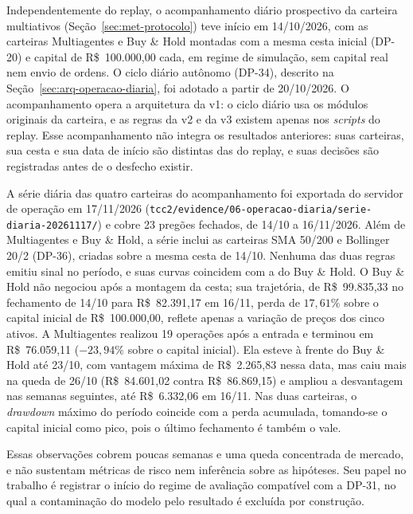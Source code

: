 Independentemente do replay, o acompanhamento diário prospectivo da carteira multiativos (Seção~\ref{sec:met-protocolo}) teve início em 14/10/2026, com as carteiras Multiagentes e Buy \& Hold montadas com a mesma cesta inicial (\mbox{DP-20}) e capital de R\$~100.000,00 cada, em regime de simulação, sem capital real nem envio de ordens. O ciclo diário autônomo (\mbox{DP-34}), descrito na Seção~\ref{sec:arq-operacao-diaria}, foi adotado a partir de 20/10/2026. O acompanhamento opera a arquitetura da v1: o ciclo diário usa os módulos originais da carteira, e as regras da v2 e da v3 existem apenas nos \textit{scripts} do replay. Esse acompanhamento não integra os resultados anteriores: suas carteiras, sua cesta e sua data de início são distintas das do replay, e suas decisões são registradas antes de o desfecho existir.

A série diária das quatro carteiras do acompanhamento foi exportada do servidor de operação em 17/11/2026 (\texttt{tcc2/evidence/06-operacao-diaria/serie-diaria-20261117/}) e cobre 23 pregões fechados, de 14/10 a 16/11/2026. Além de Multiagentes e Buy \& Hold, a série inclui as carteiras SMA 50/200 e Bollinger 20/2 (\mbox{DP-36}), criadas sobre a mesma cesta de 14/10. Nenhuma das duas regras emitiu sinal no período, e suas curvas coincidem com a do Buy \& Hold. O Buy \& Hold não negociou após a montagem da cesta; sua trajetória, de R\$~99.835,33 no fechamento de 14/10 para R\$~82.391,17 em 16/11, perda de $17{,}61\%$ sobre o capital inicial de R\$~100.000,00, reflete apenas a variação de preços dos cinco ativos. A Multiagentes realizou 19 operações após a entrada e terminou em R\$~76.059,11 ($-23{,}94\%$ sobre o capital inicial). Ela esteve à frente do Buy \& Hold até 23/10, com vantagem máxima de R\$~2.265,83 nessa data, mas caiu mais na queda de 26/10 (R\$~84.601,02 contra R\$~86.869,15) e ampliou a desvantagem nas semanas seguintes, até R\$~6.332,06 em 16/11. Nas duas carteiras, o \textit{drawdown} máximo do período coincide com a perda acumulada, tomando-se o capital inicial como pico, pois o último fechamento é também o vale.

Essas observações cobrem poucas semanas e uma queda concentrada de mercado, e não sustentam métricas de risco nem inferência sobre as hipóteses. Seu papel no trabalho é registrar o início do regime de avaliação compatível com a \mbox{DP-31}, no qual a contaminação do modelo pelo resultado é excluída por construção.
